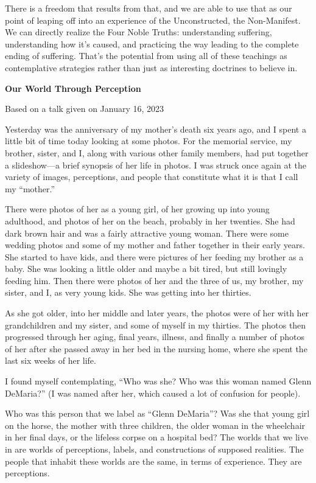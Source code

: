 There is a freedom that results from that, and we are able to use that as our point of leaping off into an experience of the Unconstructed, the Non-Manifest. We can directly realize the Four Noble Truths: understanding suffering, understanding how it's caused, and practicing the way leading to the complete ending of suffering. That's the potential from using all of these teachings as contemplative strategies rather than just as interesting doctrines to believe in.~

\textbf{Our World Through Perception}

Based on a talk given on January 16, 2023

Yesterday was the anniversary of my mother's death six years ago, and I spent a little bit of time today looking at some photos. For the memorial service, my brother, sister, and I, along with various other family members, had put together a slideshow---a brief synopsis of her life in photos. I was struck once again at the variety of images, perceptions, and people that constitute what it is that I call my ``mother.''

There were photos of her as a young girl, of her growing up into young adulthood, and photos of her on the beach, probably in her twenties. She had dark brown hair and was a fairly attractive young woman. There were some wedding photos and some of my mother and father together in their early years. She started to have kids, and there were pictures of her feeding my brother as a baby. She was looking a little older and maybe a bit tired, but still lovingly feeding him. Then there were photos of her and the three of us, my brother, my sister, and I, as very young kids. She was getting into her thirties.

As she got older, into her middle and later years, the photos were of her with her grandchildren and my sister, and some of myself in my thirties. The photos then progressed through her aging, final years, illness, and finally a number of photos of her after she passed away in her bed in the nursing home, where she spent the last six weeks of her life.~

I found myself contemplating, ``Who was she? Who was this woman named Glenn DeMaria?'' (I was named after her, which caused a lot of confusion for people).

Who was this person that we label as ``Glenn DeMaria''? Was she that young girl on the horse, the mother with three children, the older woman in the wheelchair in her final days, or the lifeless corpse on a hospital bed? The worlds that we live in are worlds of perceptions, labels, and constructions of supposed realities. The people that inhabit these worlds are the same, in terms of experience. They are perceptions.

